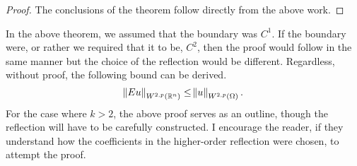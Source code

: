 \documentclass[10pt]{article}
\begin{document}
\begin{proof}
 	The conclusions of the theorem follow directly from the above work. 
\end{proof}
In the above theorem, we assumed that the boundary was $C^1$. If the boundary were, or rather we required that it to be, $C^2$, then the proof would follow in the same manner but the choice of the reflection would be different. Regardless, without proof, the following bound can be derived. 
\begin{equation*}
	\displaystyle \norm{Eu}_{W^{2,p}(\mathbb{R}^n)} \leq \norm{u}_{W^{2,p}(\Omega)}.
\end{equation*}
For the case where $k>2$, the above proof serves as an outline, though the reflection will have to be carefully constructed. I encourage the reader, if they understand how the coefficients in the higher-order reflection were chosen, to attempt the proof. 
\end{document}
